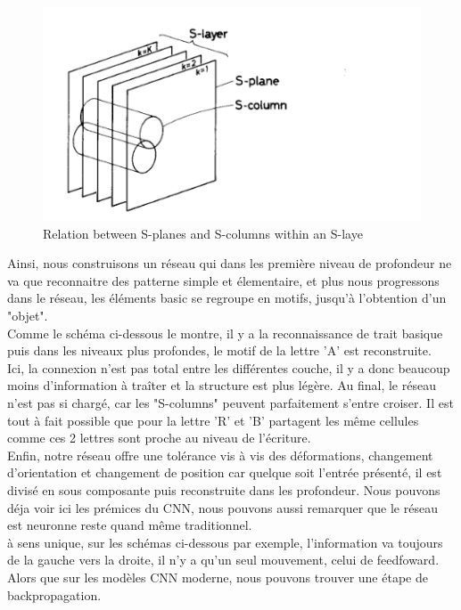 \documentclass[12pt, letterpaper]{article}
\begin{document}
\begin{figure}[H]
    \includegraphics[width=\linewidth]{img/fig3.png}
    \caption{Relation between S-planes and S-columns within an S-laye}
    \label{fig:L3}
\end{figure}

Ainsi, nous construisons un réseau qui dans les première niveau de profondeur ne va que reconnaitre des patterne simple et élementaire, et plus nous progressons 
dans le réseau, les éléments basic se regroupe en motifs, jusqu'à l'obtention d'un "objet".\\
Comme le schéma ci-dessous le montre, il y a la reconnaissance de trait basique puis dans les niveaux plus profondes, le motif de la lettre 'A' est 
reconstruite. \\
Ici, la connexion n'est pas total entre les différentes couche, il y a donc beaucoup moins d'information à traîter et la structure est plus légère.
Au final, le réseau n'est pas si chargé, car les "S-columns" peuvent parfaitement s'entre croiser. Il est tout à fait possible que pour la lettre 
'R' et 'B' partagent les même cellules comme ces 2 lettres sont proche au niveau de l'écriture. \\
Enfin, notre réseau offre une tolérance vis à vis des déformations, changement d'orientation et changement de position car quelque soit 
l'entrée présenté, il est divisé en sous composante puis reconstruite dans les profondeur.
Nous pouvons déja voir ici les prémices du CNN, nous pouvons aussi remarquer que le réseau est neuronne 
reste quand même traditionnel.\\
 à sens unique, 
sur les schémas ci-dessous par exemple, l'information va toujours de la gauche vers la droite, il n'y a qu'un seul mouvement, celui de feedfoward. \\
Alors que sur les modèles CNN moderne, nous pouvons trouver une étape de backpropagation.
\end{document}

